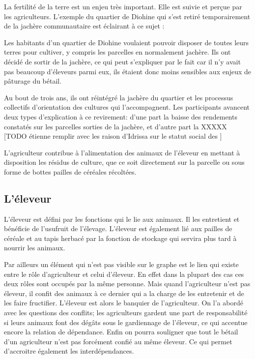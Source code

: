 La fertilité de la terre est un enjeu très important. Elle est suivie et perçue par les agriculteurs. L'exemple du quartier de Diohine qui s'est retiré temporairement de la jachère communautaire est éclairant à ce sujet :  

Les habitants d'un quartier de Diohine voulaient pouvoir disposer de toutes leurs terres pour cultiver, y compris les parcelles en normalement jachère. Ils ont décidé de sortir de la jachère, ce qui peut s'expliquer par le fait car il n'y avait pas beaucoup d'éleveurs parmi eux, ils étaient donc moins sensibles aux enjeux de pâturage du bétail. 

Au bout de trois ans, ils ont réintégré la jachère du quartier et les processus collectifs d'orientation des cultures qui l'accompagnent.
Les participants avancent deux types d'explication à ce revirement: d'une part la baisse des rendements constatés sur les parcelles sorties de la jachère, et d'autre part la XXXXX [TODO étienne remplir avec les raison d'Idrissa sur le statut social des ]


L'agriculteur contribue à l'alimentation des animaux de l'éleveur en mettant à disposition les résidus de culture, que ce soit directement sur la parcelle ou sous forme de bottes pailles de céréales récoltées. 

\subsection{L'éleveur}
L'éleveur est défini par les fonctions qui le lie aux animaux. Il les entretient et bénéficie de l'usufruit de l'élevage. L'éleveur est également lié aux pailles de céréale et au tapis herbacé par la fonction de stockage qui servira plus tard à nourrir les animaux.

Par ailleurs un élément qui n'est pas visible sur le graphe est le lien qui existe entre le rôle d'agriculteur et celui d'éleveur. En effet dans la plupart des cas ces deux rôles sont occupés par la même personne. Mais quand l'agriculteur n'est pas éleveur, il confit des animaux à ce dernier qui a la charge de les entretenir et de les faire fructifier. L'éleveur est alors le banquier de l'agriculteur. On l'a abordé avec les questions des conflits; les agriculteurs gardent une part de responsabilité si leurs animaux font des dégâts sous le gardiennage de l'éleveur, ce qui accentue encore la relation de dépendance. Enfin on pourra souligner que tout le bétail d'un agriculteur n'est pas forcément confié au même éleveur. Ce qui permet d'accroitre également les interdépendances.

